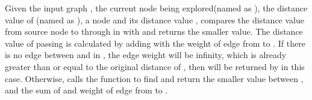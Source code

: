 Given the input graph , the current node being explored(named as ), the distance value of (named as ), a node  and its distance value ,  compares the distance value from source node to  through  in  with  and returns the smaller value. The distance value of  passing  is calculated by adding  with the weight of edge from  to . If there is no edge between  and  in , the edge weight will be infinity, which is already greater than or equal to the original distance of , then  will be returned by  in this case. Otherwise,  calls the  function to find and return the smaller value between , and the sum of  and weight of edge from  to .
\\
